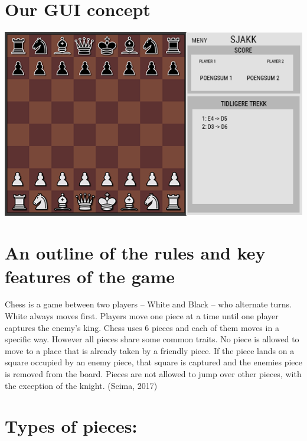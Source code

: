 \documentclass{article}
\begin{document}
    \section{Our GUI concept}
    \begin{center}
        \includegraphics[scale=0.6]{mockup_chess.png}
    \end{center}

    
    
    \section{An outline of the rules and key features of the game}
    \noindent
    Chess is a game between two players  -- White and Black -- who alternate turns. White always moves first. Players move one piece at a time until one player captures the enemy's king.  Chess uses 6 pieces and each of them moves in a specific way. However all pieces share some common traits. No piece is allowed to move to a place that is already taken by a friendly piece. If the piece lands on a square occupied by an enemy piece, that square is captured and the enemies piece is removed from the board. Pieces are not allowed to jump over other pieces, with the exception of the knight. (Scima, 2017)

\section{Types of pieces:}
\end{document}
